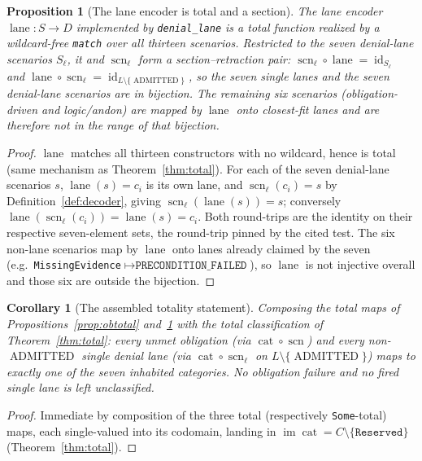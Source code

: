 \documentclass[11pt,oneside]{book}
\theoremstyle{definition}
\theoremstyle{plain}
\newtheorem{proposition}[theorem]{Proposition}
\newtheorem{corollary}[theorem]{Corollary}
\theoremstyle{remark}
\DeclareMathOperator{\im}{im}
\DeclareMathOperator{\id}{id}
\newcommand{\code}[1]{\texttt{#1}}
\newcommand{\Deny}{D}                 %
\newcommand{\Adml}{\operatorname{ADMITTED}}          %
\newcommand{\Catset}{C}              %
\newcommand{\Scnset}{S}              %
\DeclareMathOperator{\catop}{cat}
\DeclareMathOperator{\laneop}{lane}
\DeclareMathOperator{\scnop}{scn}
\begin{document}
\begin{proposition}[The lane encoder is total and a section]\label{prop:section}
The \emph{lane encoder} $\laneop:\Scnset\to\Deny$ implemented by \code{denial\_lane} is a total function realized by a wildcard-free \code{match} over all thirteen scenarios. %
Restricted to the seven denial-lane scenarios $\Scnset_\ell$, it and $\scnop_\ell$ form a section--retraction pair: $\scnop_\ell\circ\laneop=\id_{\Scnset_\ell}$ and $\laneop\circ\scnop_\ell=\id_{L\setminus\{\Adml\}}$, so the seven single lanes and the seven denial-lane scenarios are in bijection. %
The remaining six scenarios (obligation-driven and logic/andon) are mapped by $\laneop$ onto \emph{closest-fit} lanes and are therefore not in the range of that bijection. %
\end{proposition}

\begin{proof}
$\laneop$ matches all thirteen constructors with no wildcard, hence is total (same mechanism as Theorem~\ref{thm:total}). %
For each of the seven denial-lane scenarios $s$, $\laneop(s)=c_i$ is its own lane, and $\scnop_\ell(c_i)=s$ by Definition~\ref{def:decoder}, giving $\scnop_\ell(\laneop(s))=s$; conversely $\laneop(\scnop_\ell(c_i))=\laneop(s)=c_i$. %
Both round-trips are the identity on their respective seven-element sets, the round-trip pinned by the cited test. %
The six non-lane scenarios map by $\laneop$ onto lanes already claimed by the seven (e.g.\ \code{MissingEvidence}$\mapsto\code{PRECONDITION\_FAILED}$), so $\laneop$ is not injective overall and those six are outside the bijection. %
\end{proof}

\begin{corollary}[The assembled totality statement]\label{cor:assembled}
Composing the total maps of Propositions~\ref{prop:obtotal} and~\ref{prop:section} with the total classification of Theorem~\ref{thm:total}: \emph{every unmet obligation} (via $\catop\circ\scnop$) and \emph{every non-}$\Adml$\emph{ single denial lane} (via $\catop\circ\scnop_\ell$ on $L\setminus\{\Adml\}$) maps to exactly one of the seven inhabited categories. %
No obligation failure and no fired single lane is left unclassified. %
\end{corollary}

\begin{proof}
Immediate by composition of the three total (respectively \code{Some}-total) maps, each single-valued into its codomain, landing in $\im\catop=\Catset\setminus\{\code{Reserved}\}$ (Theorem~\ref{thm:total}). %
\end{proof}
\end{document}
